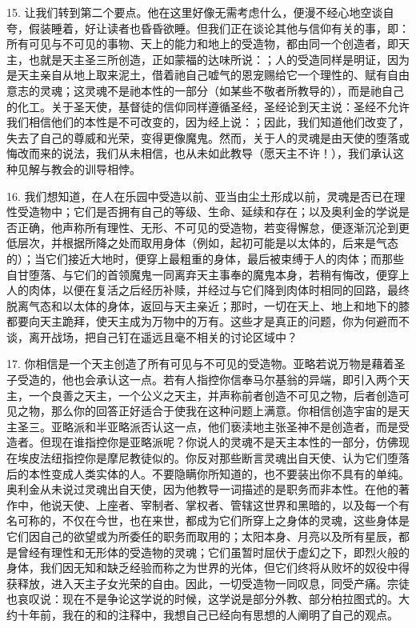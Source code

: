 15. 让我们转到第二个要点。他在这里好像无需考虑什么，便漫不经心地空谈自夸，假装睡着，好让读者也昏昏欲睡。但我们正在谈论其他与信仰有关的事，即：所有可见与不可见的事物、天上的能力和地上的受造物，都由同一个创造者，即天主，也就是天主圣三所创造，正如蒙福的达味所说：；人的受造同样是明证，因为是天主亲自从地上取来泥土，借着祂自己嘘气的恩宠赐给它一个理性的、赋有自由意志的灵魂；这灵魂不是祂本性的一部分（如某些不敬者所教导的），而是祂自己的化工。关于圣天使，基督徒的信仰同样遵循圣经，圣经论到天主说：圣经不允许我们相信他们的本性是不可改变的，因为经上说：；因此，我们知道他们改变了，失去了自己的尊威和光荣，变得更像魔鬼。然而，关于人的灵魂是由天使的堕落或悔改而来的说法，我们从未相信，也从未如此教导（愿天主不许！），我们承认这种见解与教会的训导相悖。\par

16. 我们想知道，在人在乐园中受造以前、亚当由尘土形成以前，灵魂是否已在理性受造物中；它们是否拥有自己的等级、生命、延续和存在；以及奥利金的学说是否正确，他声称所有理性、无形、不可见的受造物，若变得懈怠，便逐渐沉沦到更低层次，并根据所降之处而取用身体（例如，起初可能是以太体的，后来是气态的）；当它们接近大地时，便穿上最粗重的身体，最后被束缚于人的肉体；而那些自甘堕落、与它们的首领魔鬼一同离弃天主事奉的魔鬼本身，若稍有悔改，便穿上人的肉体，以便在复活之后经历补赎，并经过与它们降到肉体时相同的回路，最终脱离气态和以太体的身体，返回与天主亲近；那时，一切在天上、地上和地下的膝都要向天主跪拜，使天主成为万物中的万有。这些才是真正的问题，你为何避而不谈，离开战场，把自己钉在遥远且毫不相关的讨论区域中？\par

17. 你相信是一个天主创造了所有可见与不可见的受造物。亚略若说万物是藉着圣子受造的，他也会承认这一点。若有人指控你信奉马尔基翁的异端，即引入两个天主，一个良善之天主，一个公义之天主，并声称前者创造不可见之物，后者创造可见之物，那么你的回答正好适合于使我在这种问题上满意。你相信创造宇宙的是天主圣三。亚略派和半亚略派否认这一点，他们亵渎地主张圣神不是创造者，而是受造者。但现在谁指控你是亚略派呢？你说人的灵魂不是天主本性的一部分，仿佛现在埃皮法纽指控你是摩尼教徒似的。你反对那些断言灵魂出自天使、认为它们堕落后的本性变成人类实体的人。不要隐瞒你所知道的，也不要装出你不具有的单纯。奥利金从未说过灵魂出自天使，因为他教导一词描述的是职务而非本性。在他的著作中，他说天使、上座者、宰制者、掌权者、管辖这世界和黑暗的，以及每一个有名可称的，不仅在今世，也在来世，都成为它们所穿上之身体的灵魂，这些身体是它们因自己的欲望或为所委任的职务而取用的；太阳本身、月亮以及所有星辰，都是曾经有理性和无形体的受造物的灵魂；它们虽暂时屈伏于虚幻之下，即烈火般的身体，我们因无知和缺乏经验而称之为世界的光体，但它们终将从败坏的奴役中得获释放，进入天主子女光荣的自由。因此，一切受造物一同叹息，同受产痛。宗徒也哀叹说：现在不是争论这学说的时候，这学说是部分外教、部分柏拉图式的。大约十年前，我在的和的注释中，我想自己已经向有思想的人阐明了自己的观点。\par

